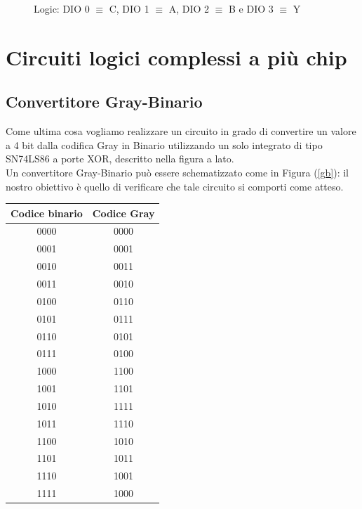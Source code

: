 \documentclass[10pt, a4paper, italian]{article}
\begin{document}
\begin{figure}[htb!]
    \centering
    \caption{Logic: DIO 0 $\equiv$ C, DIO 1 $\equiv$ A, DIO 2 $\equiv$ B e DIO 3 $\equiv$ Y}
\end{figure}


\section{Circuiti logici complessi a più chip}
\subsection{Convertitore Gray-Binario}
\begin{minipage}{0.7\textwidth}
    Come ultima cosa vogliamo realizzare un circuito in grado di convertire un valore a 4 bit dalla codifica Gray in Binario utilizzando un solo integrato di tipo SN74LS86 a porte XOR, descritto nella figura a lato.\\
    Un convertitore Gray-Binario può essere schematizzato come in Figura (\ref{gb}): il nostro obiettivo è quello di verificare che tale circuito si comporti come atteso.
\end{minipage}
\begin{minipage}{0.3\textwidth}
\end{minipage}
\newline
\begin{minipage}{0.5\textwidth}
    \centering
    \label{gb}
\end{minipage}
\begin{minipage}{0.5\textwidth}
    \centering
    \begin{tabular}{c||c}
        Codice binario & Codice Gray \\
        \hline
        \hline
        0000 & 0000\\
        0001 & 0001\\
        0010 & 0011\\
        0011 & 0010\\
        0100 & 0110\\
        0101 & 0111\\
        0110 & 0101\\
        0111 & 0100\\
        1000 & 1100\\
        1001 & 1101\\
        1010 & 1111\\
        1011 & 1110\\
        1100 & 1010\\
        1101 & 1011\\
        1110 & 1001\\
        1111 & 1000\\
        \end{tabular}
    \label{grbin}
\end{minipage}
\end{document}
